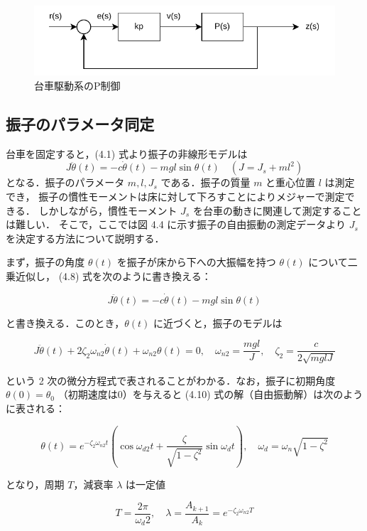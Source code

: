 \begin{figure}[h]
  \centering
  \includegraphics[scale=1]{sozai/2.pdf}
  \caption{台車駆動系のP制御}
\end{figure}

\subsection{振子のパラメータ同定}

台車を固定すると，(4.1) 式より振子の非線形モデルは
\[
  J\ddot{\theta}(t) = -c\dot{\theta}(t) - mgl\sin\theta(t) \quad (J = J_s + ml^2) \tag{4.8}
\]
となる．振子のパラメータ \( m, l, J_s \) である．振子の質量 \( m \) と重心位置 \( l \) は測定でき，
振子の慣性モーメントは床に対して下ろすことによりメジャーで測定できる．
しかしながら，慣性モーメント \( J_s \) を台車の動きに関連して測定することは難しい．
そこで，ここでは図 4.4 に示す振子の自由振動の測定データより \( J_s \) を決定する方法について説明する．

まず，振子の角度 \( \theta(t) \) を振子が床から下への大振幅を持つ \( \theta(t) \) について二乗近似し，
(4.8) 式を次のように書き換える：

\[
  J\ddot{\theta}(t) = -c\dot{\theta}(t) - mgl\sin\theta(t) \tag{4.9}
\]

と書き換える．このとき，\( \theta(t) \) に近づくと，振子のモデルは

\[
  J\ddot{\theta}(t) + 2\zeta_{2}\omega_{n2}\dot{\theta}(t) + \omega_{n2} \theta(t) = 0, \quad \omega_{n2} = \frac{mgl}{J}, \quad \zeta_2 = \frac{c}{2\sqrt{mglJ}} \tag{4.10}
\]

という 2 次の微分方程式で表されることがわかる．なお，振子に初期角度 \( \theta(0) = \theta_0 \)
（初期速度は0）を与えると (4.10) 式の解（自由振動解）は次のように表される：

\[
  \theta(t) = e^{-\zeta_{2}\omega_{n2}t} \left( \cos\omega_{d2}t + \frac{\zeta}{\sqrt{1-\zeta^2}} \sin \omega_d t \right), \quad \omega_d = \omega_n\sqrt{1-\zeta^2} \tag{4.11}
\]

となり，周期 \( T \)，減衰率 \( \lambda \) は一定値

\[
  T = \frac{2\pi}{\omega_d2}, \quad \lambda = \frac{A_{k+1}}{A_k} = e^{-\zeta_{2}\omega_{n2} T} \tag{4.12}
\]

